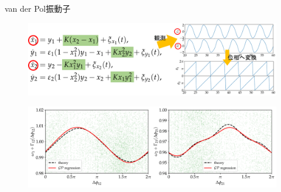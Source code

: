 \begin{frame}{van der Pol振動子}
\begin{figure}
  \includegraphics[height=0.35\textheight]{figs/vdp_schematic.pdf}
\end{figure}
\begin{figure}
  \includegraphics[width=\textwidth]{code/vdp_20221121/fig20221121/exp01case01.pdf}
\end{figure}
\end{frame}

